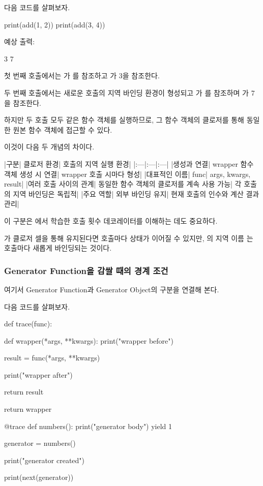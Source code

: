 다음 코드를 살펴보자.

\begin{dhkcode}
print(add(1, 2))
print(add(3, 4))
\end{dhkcode}

예상 출력:

\begin{dhkzsh}
3
7
\end{dhkzsh}

첫 번째 호출에서는 가 를 참조하고 가 3을 참조한다.

두 번째 호출에서는 새로운 호출의 지역 바인딩 환경이 형성되고 가 를 참조하며 가 7을 참조한다.

하지만 두 호출 모두 같은  함수 객체를 실행하므로, 그 함수 객체의 클로저를 통해 동일한 원본 함수 객체에 접근할 수 있다.

이것이 다음 두 개념의 차이다.

\begin{dhktable}
|구분|	클로저 환경|	호출의 지역 실행 환경|
|:---|:---|:---|
|생성과 연결|	wrapper 함수 객체 생성 시 연결|	wrapper 호출 시마다 형성|
|대표적인 이름|	func|	args, kwargs, result|
|여러 호출 사이의 관계|	동일한 함수 객체의 클로저를 계속 사용 가능|	각 호출의 지역 바인딩은 독립적|
|주요 역할|	외부 바인딩 유지|	현재 호출의 인수와 계산 결과 관리|
\end{dhktable}

이 구분은 에서 학습한 호출 횟수 데코레이터를 이해하는 데도 중요하다.

가 클로저 셀을 통해 유지된다면 호출마다 상태가 이어질 수 있지만, 의 지역 이름 는 호출마다 새롭게 바인딩되는 것이다.

\subsubsection{Generator Function을 감쌀 때의 경계 조건}

여기서 Generator Function과 Generator Object의 구분을 연결해 본다.

다음 코드를 살펴보자.

\begin{dhkcode}
def trace(func):

    def wrapper(*args, **kwargs):
        print("wrapper before")

        result = func(*args, **kwargs)

        print("wrapper after")

        return result

    return wrapper


@trace
def numbers():
    print("generator body")
    yield 1


generator = numbers()

print("generator created")

print(next(generator))
\end{dhkcode}

